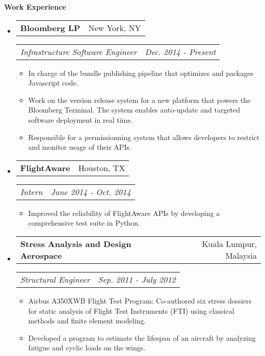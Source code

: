 \documentclass[letterpaper,11pt]{article}
\makeatletter
\newcommand{\resitem}[1]{\item #1 \vspace{-2pt}}
\newcommand{\resheading}[1]{{\begin{mdframed}[backgroundcolor=mygray]{\large \textbf{#1}}\end{mdframed}}}
\newcommand{\restitle}[2]{
\begin{tabular*}{7.0in}{l@{\extracolsep{\fill}}r}
		\textbf{#1} & #2 \\
\end{tabular*}}
\newcommand{\ressubtitle}[2]{
\begin{tabular*}{7.0in}{l@{\extracolsep{\fill}}r}
		\textit{#1} & \textit{#2} \\
\end{tabular*}\vspace{-6pt}}
\makeatother
\begin{document}
\resheading{Work Experience}
\begin{itemize}

\item
	\restitle{Bloomberg LP}{New York, NY}
	\ressubtitle{Infrastructure Software Engineer}{Dec. 2014 - Present}
	\begin{itemize}
		\resitem{In charge of the bundle publishing pipeline that optimizes and packages Javascript code.}
		\resitem{Work on the version release system for a new platform that powers the Bloomberg Terminal.
		         The system enables auto-update and targeted software deployment in real time.}
		\resitem{Responsible for a permissionning system that allows developers to restrict and monitor usage of their APIs.}
	\end{itemize}

\item
	\restitle{FlightAware}{Houston, TX}
	\ressubtitle{Intern}{June 2014 - Oct. 2014}
	\begin{itemize}
		\resitem{Improved the reliability of FlightAware APIs by developing a comprehensive test suite in Python.}
	\end{itemize}

\item
	\restitle{Stress Analysis and Design Aerospace}{Kuala Lumpur, Malaysia}
	\ressubtitle{Structural Engineer}{Sep. 2011 - July 2012}
	\begin{itemize}
		\resitem{Airbus A350XWB Flight Test Program: Co-authored six stress dossiers for static analysis of Flight Test Instruments (FTI) using classical methods and finite element modeling.}
		\resitem{Developed a program to estimate the lifespan of an aircraft by analyzing fatigue and cyclic loads on the wings.}
	\end{itemize}

\end{itemize}


\end{document}
